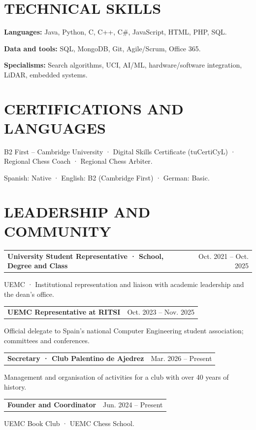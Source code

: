 \documentclass[10pt,a4paper]{article}
\makeatletter
\newcommand{\entry}[3]{\noindent\begin{tabularx}{\linewidth}{@{}Xr@{}}\textbf{#1}&{\small\color{muted}#2}\end{tabularx}\par{\small\color{muted}#3}\par}
\makeatother
\begin{document}
\section*{TECHNICAL SKILLS}
\textbf{Languages:} Java, Python, C, C++, C\#, JavaScript, HTML, PHP, SQL.\par
\textbf{Data and tools:} SQL, MongoDB, Git, Agile/Scrum, Office 365.\par
\textbf{Specialisms:} Search algorithms, UCI, AI/ML, hardware/software integration, LiDAR, embedded systems.\par
\section*{CERTIFICATIONS AND LANGUAGES}
B2 First -- Cambridge University · Digital Skills Certificate (tuCertiCyL) · Regional Chess Coach · Regional Chess Arbiter.\par
Spanish: Native · English: B2 (Cambridge First) · German: Basic.
\section*{LEADERSHIP AND COMMUNITY}
\entry{University Student Representative · School, Degree and Class}{Oct. 2021 -- Oct. 2025}{UEMC · Institutional representation and liaison with academic leadership and the dean’s office.}\vspace{4pt}
\entry{UEMC Representative at RITSI}{Oct. 2023 -- Nov. 2025}{Official delegate to Spain’s national Computer Engineering student association; committees and conferences.}\vspace{4pt}
\entry{Secretary · Club Palentino de Ajedrez}{Mar. 2026 -- Present}{Management and organisation of activities for a club with over 40 years of history.}\vspace{4pt}
\entry{Founder and Coordinator}{Jun. 2024 -- Present}{UEMC Book Club · UEMC Chess School.}\vspace{4pt}
\end{document}
